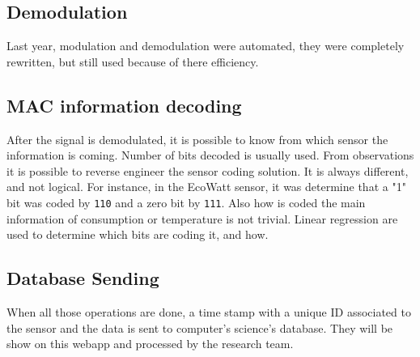 \subsection{Demodulation}
Last year, modulation and demodulation were automated, they were completely rewritten, but still used because of there efficiency.
\subsection{MAC information decoding}
After the signal is demodulated, it is possible to know from which sensor the information is coming. Number of bits decoded is usually used.
From observations it is possible to reverse engineer the sensor coding solution. It is always different, and not logical. For instance, in the EcoWatt sensor, it was determine that a "1" bit was coded by \texttt{110} and a zero bit by \texttt{111}. Also how is coded the main information of consumption or temperature is not trivial. Linear regression are used to determine which bits are coding it, and how.
\subsection{Database Sending}
When all those operations are done, a time stamp with a unique ID associated to the sensor and the data is sent to computer's science's database. They will be show on this webapp and processed by the research team.